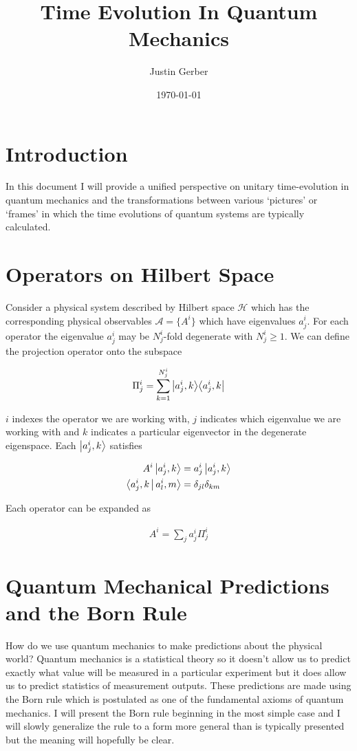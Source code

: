 \documentclass[12pt]{article}
\newcommand{\ketbra}[2]{\Ket{#1}\!\Bra{#2}}
\begin{document}
\title{Time Evolution In Quantum Mechanics}
\author{Justin Gerber}
\date{\today}
\maketitle

\section{Introduction}
In this document I will provide a unified perspective on unitary time-evolution in quantum mechanics and the transformations between various `pictures' or `frames' in which the time evolutions of quantum systems are typically calculated.

\section{Operators on Hilbert Space}

Consider a physical system described by Hilbert space $\mathcal{H}$ which has the corresponding physical observables $\mathcal{A} = \{A^i\}$ which have eigenvalues $a^i_j$. For each operator the eigenvalue $a^i_j$ may be $N^i_j$-fold degenerate with $N^i_j \ge 1$. We can define the projection operator onto the subspace

\begin{align}
\Pi^i_j = \sum_{k=1}^{N^i_j} \ketbra{a^i_j,k}{a^i_j,k}
\end{align}

$i$ indexes the operator we are working with, $j$ indicates which eigenvalue we are working with and $k$ indicates a particular eigenvector in the degenerate eigenspace. Each $\Ket{a^i_j,k}$ satisfies

\begin{align}
A^i \Ket{a^i_j,k} &= a^i_j \Ket{a^i_j,k}\\
\Braket{a^i_j,k|a^i_l,m} &= \delta_{jl}\delta_{km}
\end{align}

Each operator can be expanded as

\begin{align}
A^i = \sum_j a^i_j \Pi^i_j
\end{align}

\section{Quantum Mechanical Predictions and the Born Rule}

How do we use quantum mechanics to make predictions about the physical world?
Quantum mechanics is a statistical theory so it doesn't allow us to predict exactly what value will be measured in a particular experiment but it does allow us to predict statistics of measurement outputs.
These predictions are made using the Born rule which is postulated as one of the fundamental axioms of quantum mechanics.
I will present the Born rule beginning in the most simple case and I will slowly generalize the rule to a form more general than is typically presented but the meaning will hopefully be clear.
\end{document}
